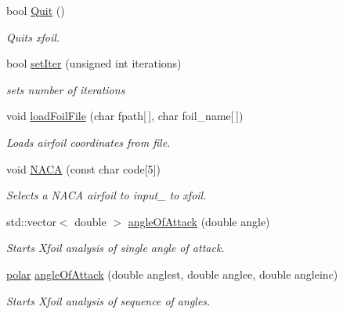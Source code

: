 \begin{DoxyCompactItemize}
\mbox{\label{classXfoilInterface_a7225d1f5817cb79f9f938c8dc616a360}} 
bool \hyperlink{classXfoilInterface_a7225d1f5817cb79f9f938c8dc616a360}{Quit} ()
\begin{DoxyCompactList}\small\item\em Quits xfoil. \end{DoxyCompactList}\item 
\mbox{\label{classXfoilInterface_a21659717b7901562e97d25460e8c4f42}} 
bool \hyperlink{classXfoilInterface_a21659717b7901562e97d25460e8c4f42}{set\+Iter} (unsigned int iterations)
\begin{DoxyCompactList}\small\item\em sets number of iterations \end{DoxyCompactList}\item 
void \hyperlink{classXfoilInterface_ae6be41dc3be9e28cd36ed5e9a40b0854}{load\+Foil\+File} (char fpath\mbox{[}$\,$\mbox{]}, char foil_name\mbox{[}$\,$\mbox{]})
\begin{DoxyCompactList}\small\item\em Loads airfoil coordinates from file. \end{DoxyCompactList}\item 
void \hyperlink{classXfoilInterface_a202072a14053054a55501c45a296bce7}{N\+A\+CA} (const char code\mbox{[}5\mbox{]})
\begin{DoxyCompactList}\small\item\em Selects a N\+A\+CA airfoil to input_ to xfoil. \end{DoxyCompactList}\item
std\+::vector$<$ double $>$ \hyperlink{classXfoilInterface_a7937559afde3fe6880b64b4d8b278256}{angle\+Of\+Attack} (double angle)
\begin{DoxyCompactList}\small\item\em Starts Xfoil analysis of single angle of attack. \end{DoxyCompactList}\item 
\hyperlink{classpolar}{polar} \hyperlink{classXfoilInterface_ac2b547ba157afbb666ddf5f3eff271e2}{angle\+Of\+Attack} (double anglest, double anglee, double angleinc)
\begin{DoxyCompactList}\small\item\em Starts Xfoil analysis of sequence of angles. \end{DoxyCompactList}\item 

\end{DoxyCompactItemize}
